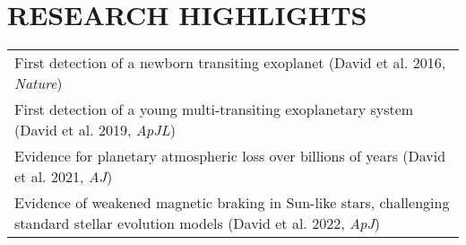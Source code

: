 \section{\large RESEARCH HIGHLIGHTS}
\begin{tabular}{l}
    First detection of a newborn transiting exoplanet (David et al. 2016, \textit{Nature}) \\
    First detection of a young multi-transiting exoplanetary system (David et al. 2019, \textit{ApJL}) \\
    Evidence for planetary atmospheric loss over billions of years (David et al. 2021, \textit{AJ}) \\
    Evidence of weakened magnetic braking in Sun-like stars, challenging standard stellar evolution models (David et al. 2022, \textit{ApJ}) \\
\end{tabular}
